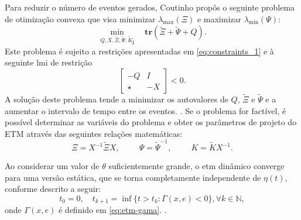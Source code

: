 Para reduzir o número de eventos gerados, Coutinho propôs o seguinte problema de otimização convexa que visa minimizar $\lambda_{\max} (\Xi)$ e maximizar $\lambda_{\min}(\Psi)$: \begin{equation}\underset{Q, X, \tilde{\Xi}, \tilde{\Psi}, \tilde{K}_\mathbf{j}}\min \quad \mathbf{tr}(\tilde{\Xi} + \tilde{\Psi} + Q). \label{eq:optimization_problem}\end{equation} Este problema é sujeito a restrições apresentadas em \ref{eq:constraints_1} e à seguinte \acrshort{lmi} de restrição \begin{equation}\begin{bmatrix}
  -Q & I \\ \star & -X
\end{bmatrix} < 0. \label{eq:constraints_2}\end{equation} A solução deste problema tende a minimizar os autovalores de $Q$, $\tilde{\Xi}$ e $\tilde{\Psi}$ e a aumentar o intervalo de tempo entre os eventos. \cite{coutinho2021}. Se o problema for factível, é possível determinar as variáveis do problema e obter os parâmetros de projeto do ETM através das seguintes relações matemáticas: \begin{equation}
  \Xi = X ^ {-1} \tilde{\Xi} X, \hspace{1cm}
  \Psi = \tilde{\Psi} ^ {-1}, \hspace{1cm}
  K = \tilde{K} X^{-1}.
  \label{eq:etm_parameters}
\end{equation}

Ao considerar um valor de $\theta$ suficientemente grande, o \acrshort{etm} dinâmico converge para uma versão estática, que se torna completamente independente de $\eta(t)$, conforme descrito a seguir: \begin{equation} t_0 = 0, \quad t_{k+1} = \inf\{t > t_k : \Gamma(x, e) < 0\}, \forall k \in \mathbb{N}, \end{equation} onde $\Gamma(x, e)$ é definido em \eqref{eq:etm-gama}. \cite{coutinho2021}.